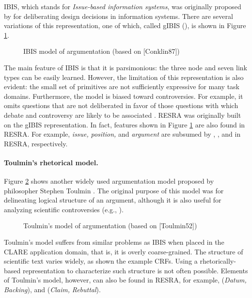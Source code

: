 IBIS, which stands for {\it Issue-based information systems\/}, was
originally proposed by \cite{Kunz70} for deliberating design decisions in
information systems.  There are several variations of this representation,
one of which, called gIBIS (\cite{Conklin88}), is shown in Figure
\ref{fig:ibis}.

\begin{figure}[htbp]
 \caption{IBIS model of argumentation (based on [Conklin87])}
  \label{fig:ibis}
\end{figure}

The main feature of IBIS is that it is parsimonious: the three node and
seven link types can be easily learned. However, the limitation of this
representation is also evident: the small set of primitives are not
sufficiently expressive for many task domains.  Furthermore, the model is
biased toward controversies. For example, it omits questions that are not
deliberated in favor of those questions with which debate and controversy
are likely to be associated \cite{MacLean91Questions}.  RESRA was
originally built on the gIBIS representation. In fact, features
shown in Figure \ref{fig:ibis} are also found in RESRA.  For example, {\it
issue,\/} {\it position,\/} and {\it argument\/} are subsumed by
, , and  in RESRA,
respectively.


\paragraph{Toulmin's rhetorical model.}

Figure \ref{fig:toulmin} shows another widely used argumentation model
proposed by philosopher Stephen Toulmin \cite{Toulmin58}. The original
purpose of this model was for delineating logical structure of an argument,
although it is also useful for analyzing scientific controversies (e.g.,
\cite{Cavalli-Sforza92}).

\begin{figure}[htbp]
 \caption{Toulmin's model of argumentation (based on [Toulmin52])}
  \label{fig:toulmin}
\end{figure}

Toulmin's model suffers from similar problems as IBIS when placed in the
CLARE application domain, that is, it is overly coarse-grained. The
structure of scientific text varies widely, as shown the example
CRFs. Using a rhetorically-based representation to characterize such
structure is not often possible. Elements of Toulmin's model, however, can
also be found in RESRA, for example,  ({\it Datum,\/}
{\it Backing\/}), and  ({\it Claim,\/} {\it Rebuttal\/}).


